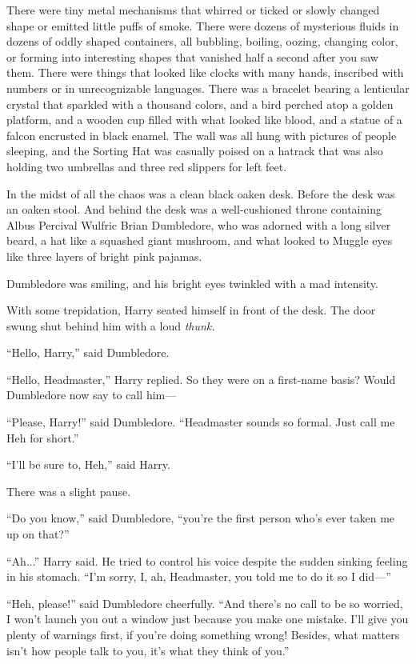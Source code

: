 There were tiny metal mechanisms that whirred or ticked or slowly changed shape or emitted little puffs of smoke. There were dozens of mysterious fluids in dozens of oddly shaped containers, all bubbling, boiling, oozing, changing color, or forming into interesting shapes that vanished half a second after you saw them. There were things that looked like clocks with many hands, inscribed with numbers or in unrecognizable languages. There was a bracelet bearing a lenticular crystal that sparkled with a thousand colors, and a bird perched atop a golden platform, and a wooden cup filled with what looked like blood, and a statue of a falcon encrusted in black enamel. The wall was all hung with pictures of people sleeping, and the Sorting Hat was casually poised on a hatrack that was also holding two umbrellas and three red slippers for left feet.

In the midst of all the chaos was a clean black oaken desk. Before the desk was an oaken stool. And behind the desk was a well-cushioned throne containing Albus Percival Wulfric Brian Dumbledore, who was adorned with a long silver beard, a hat like a squashed giant mushroom, and what looked to Muggle eyes like three layers of bright pink pajamas.

Dumbledore was smiling, and his bright eyes twinkled with a mad intensity.

With some trepidation, Harry seated himself in front of the desk. The door swung shut behind him with a loud \emph{thunk.}

“Hello, Harry,” said Dumbledore.

“Hello, Headmaster,” Harry replied. So they were on a first-name basis? Would Dumbledore now say to call him—

“Please, Harry!” said Dumbledore. “Headmaster sounds so formal. Just call me Heh for short.”

“I’ll be sure to, Heh,” said Harry.

There was a slight pause.

“Do you know,” said Dumbledore, “you’re the first person who’s ever taken me up on that?”

“Ah...” Harry said. He tried to control his voice despite the sudden sinking feeling in his stomach. “I’m sorry, I, ah, Headmaster, you told me to do it so I did—”

“Heh, please!” said Dumbledore cheerfully. “And there’s no call to be so worried, I won’t launch you out a window just because you make one mistake. I’ll give you plenty of warnings first, if you’re doing something wrong! Besides, what matters isn’t how people talk to you, it’s what they think of you.”


